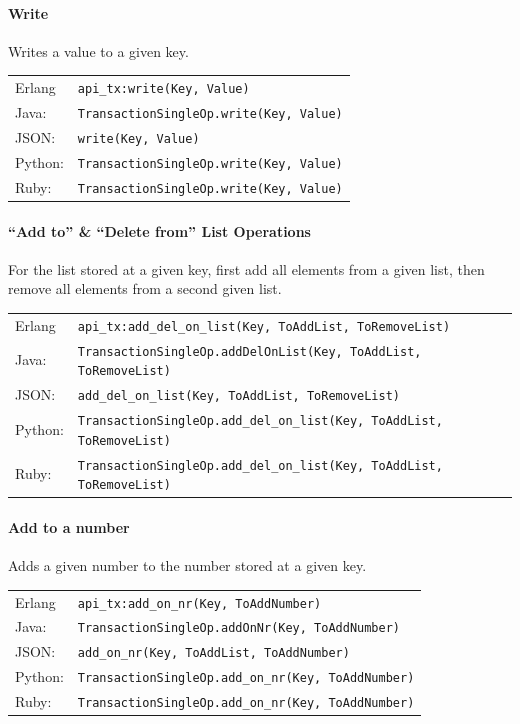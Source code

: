\documentclass[a4paper]{scrreprt}
\newcommand{\code}[1]{\lstinline[basicstyle=\ttfamily]!#1!}
\begin{document}
\paragraph{Write}
Writes a value to a given key.

\begin{tabular}{lp{14cm}}
Erlang  & \code{api_tx:write(Key, Value)}\\
Java:   & \code{TransactionSingleOp.write(Key, Value)}\\
JSON:   & \code{write(Key, Value)}\\
Python: & \code{TransactionSingleOp.write(Key, Value)}\\
Ruby:   & \code{TransactionSingleOp.write(Key, Value)}
\end{tabular}

\paragraph{``Add to'' \& ``Delete from'' List Operations}
For the list stored at a given key, first add all elements from a given list,
then remove all elements from a second given list.

\begin{tabular}{lp{14cm}}
Erlang  & \code{api_tx:add_del_on_list(Key, ToAddList, ToRemoveList)}\\
Java:   & \code{TransactionSingleOp.addDelOnList(Key, ToAddList, ToRemoveList)}\\
JSON:   & \code{add_del_on_list(Key, ToAddList, ToRemoveList)}\\
Python: & \code{TransactionSingleOp.add_del_on_list(Key, ToAddList, ToRemoveList)}\\
Ruby:   & \code{TransactionSingleOp.add_del_on_list(Key, ToAddList, ToRemoveList)}
\end{tabular}

\paragraph{Add to a number}
Adds a given number to the number stored at a given key.

\begin{tabular}{lp{14cm}}
Erlang  & \code{api_tx:add_on_nr(Key, ToAddNumber)}\\
Java:   & \code{TransactionSingleOp.addOnNr(Key, ToAddNumber)}\\
JSON:   & \code{add_on_nr(Key, ToAddList, ToAddNumber)}\\
Python: & \code{TransactionSingleOp.add_on_nr(Key, ToAddNumber)}\\
Ruby:   & \code{TransactionSingleOp.add_on_nr(Key, ToAddNumber)}
\end{tabular}
\end{document}
